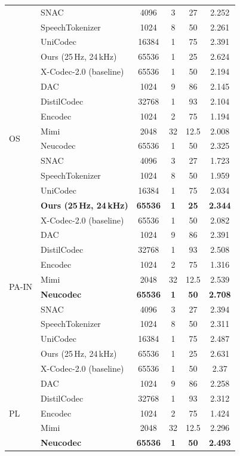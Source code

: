 \documentclass[preprint]{article}
\begin{document}
\begin{longtable}{llcccc}
  & SNAC & 4096 & 3 & 27 & 2.252 \\
  & SpeechTokenizer & 1024 & 8 & 50 & 2.261 \\
  & UniCodec & 16384 & 1 & 75 & 2.391 \\
  & Ours (25\,Hz, 24\,kHz) & 65536 & 1 & 25 & 2.624 \\
  & X-Codec-2.0 (baseline) & 65536 & 1 & 50 & 2.194 \\
\midrule
\multirow{8}{*}{OS}
  & DAC & 1024 & 9 & 86 & 2.145 \\
  & DistilCodec & 32768 & 1 & 93 & 2.104 \\
  & Encodec & 1024 & 2 & 75 & 1.194 \\
  & Mimi & 2048 & 32 & 12.5 & 2.008 \\
  & Neucodec & 65536 & 1 & 50 & 2.325 \\
  & SNAC & 4096 & 3 & 27 & 1.723 \\
  & SpeechTokenizer & 1024 & 8 & 50 & 1.959 \\
  & UniCodec & 16384 & 1 & 75 & 2.034 \\
  & \textbf{Ours (25\,Hz, 24\,kHz)} & \textbf{65536} & \textbf{1} & \textbf{25} & \textbf{2.344} \\
  & X-Codec-2.0 (baseline) & 65536 & 1 & 50 & 2.082 \\
\midrule
\multirow{8}{*}{PA-IN}
  & DAC & 1024 & 9 & 86 & 2.391 \\
  & DistilCodec & 32768 & 1 & 93 & 2.508 \\
  & Encodec & 1024 & 2 & 75 & 1.316 \\
  & Mimi & 2048 & 32 & 12.5 & 2.539 \\
  & \textbf{Neucodec} & \textbf{65536} & \textbf{1} & \textbf{50} & \textbf{2.708} \\
  & SNAC & 4096 & 3 & 27 & 2.394 \\
  & SpeechTokenizer & 1024 & 8 & 50 & 2.311 \\
  & UniCodec & 16384 & 1 & 75 & 2.487 \\
  & Ours (25\,Hz, 24\,kHz) & 65536 & 1 & 25 & 2.631 \\
  & X-Codec-2.0 (baseline) & 65536 & 1 & 50 & 2.37 \\
\midrule
\multirow{8}{*}{PL}
  & DAC & 1024 & 9 & 86 & 2.258 \\
  & DistilCodec & 32768 & 1 & 93 & 2.312 \\
  & Encodec & 1024 & 2 & 75 & 1.424 \\
  & Mimi & 2048 & 32 & 12.5 & 2.296 \\
  & \textbf{Neucodec} & \textbf{65536} & \textbf{1} & \textbf{50} & \textbf{2.493} \\

\end{longtable}
\end{document}
